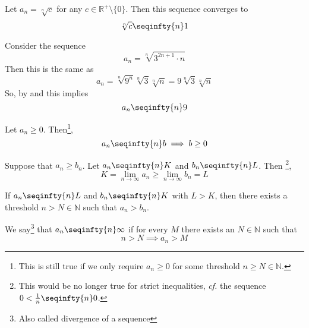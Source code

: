 \begin{thm}\label{thm-sequence-nth-root-of-constant}
	Let $a_n=\sqrt[n]{c}$ for any $c\in\mathbb{R}^+\setminus\{0\}$. Then this
	sequence converges to
	\begin{equation*}
		\sqrt[n]{c} \seqinfty{n} 1
	\end{equation*}
\end{thm}

\begin{exm}\label{exm-sequence-nth-root}
	Consider the sequence
	\begin{equation*}
		a_n =\sqrt[n]{3^{2n+1} \cdot n}
	\end{equation*}
	Then this is the same as
	\begin{equation*}
		a_n = \sqrt[n]{9^n}\sqrt[n]{3}\sqrt[n]{n} = 9\sqrt[n]{3}\sqrt[n]{n}
	\end{equation*}
	So, by  and 
	this implies
	\begin{equation*}
		a_n \seqinfty{n} 9
	\end{equation*}
\end{exm}

\begin{thm}\label{thm-sequence-converges-positively}
	Let $a_n\geq0$. Then\footnote{This is still true if we only require $a_n\geq0$
		for some threshold $n\geq N\in\mathbb{N}$.},
	\begin{equation*}
		a_n \seqinfty{n} b \implies b \geq 0
	\end{equation*}
\end{thm}

\begin{thm}\label{thm-sequence-limit-greater-than}
	Suppose that $a_n \geq b_n$. Let $a_n \seqinfty{n} K$ and $b_n \seqinfty{n} L$. Then
	\footnote{This would be no longer true for strict inequalities, \textit{cf.} the
		sequence $0<\tfrac{1}{n}\seqinfty{n}0$.},
	\begin{equation*}
		K = \lim_{n\to\infty} a_n \geq \lim_{n\to\infty} b_n = L
	\end{equation*}
\end{thm}

\begin{thm}\label{thm-sequence-greater-than}
	If $a_n \seqinfty{n} L$ and $b_n \seqinfty{n} K$ with $L > K$, then there exists
	a threshold $n>N\in\mathbb{N}$ such that $a_n>b_n$.
\end{thm}

\begin{definition}\label{def-sequence-divergence}
	We say\footnote{Also called divergence of a sequence} that $a_n \seqinfty{n} \infty$
	if for every $M$ there exists an $N\in\mathbb{N}$ such that
	\begin{equation*}
		n>N \implies a_n > M
	\end{equation*}
\end{definition}

